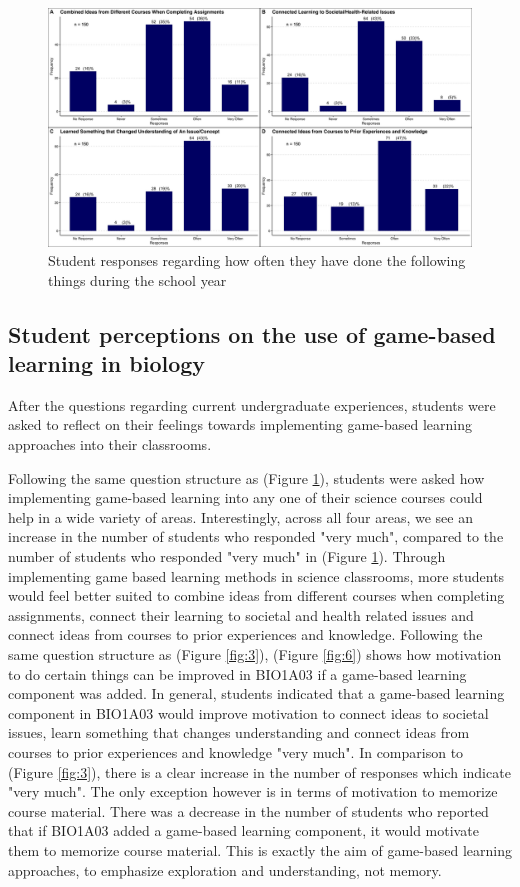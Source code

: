 \documentclass[10pt]{article}
\providecommand{\figref}[1]{(Figure \ref{#1})}  %
\begin{document}
\begin{figure}[H]
	\includegraphics[width=\textwidth]{figures_4f06/how_often_haveyou_done_thefollowing.jpg}
	\caption{Student responses regarding how often they have done the following things during the school year}
	\label{fig:4}
\end{figure}

\subsection{Student perceptions on the use of game-based learning in biology}

After the questions regarding current undergraduate experiences, students were asked to reflect on their feelings towards implementing game-based learning approaches into their classrooms. 

Following the same question structure as \figref{fig:4}, students were asked how implementing game-based learning into any one of their science courses could help in a wide variety of areas. Interestingly, across all four areas, we see an increase in the number of students who responded "very much", compared to the number of students who responded "very much" in \figref{fig:4}. Through implementing game based learning methods in science classrooms, more students would feel better suited to combine ideas from different courses when completing assignments, connect their learning to societal and health related issues and connect ideas from courses to prior experiences and knowledge. Following the same question structure as \figref{fig:3}, \figref{fig:6} shows how motivation to do certain things can be improved in BIO1A03 if a game-based learning component was added. In general, students indicated that a game-based learning component in BIO1A03 would improve motivation to connect ideas to societal issues, learn something that changes understanding and connect ideas from courses to prior experiences and knowledge "very much". In comparison to \figref{fig:3}, there is a clear increase in the number of responses which indicate "very much". The only exception however is in terms of motivation to memorize course material. There was a decrease in the number of students who reported that if BIO1A03 added a game-based learning component, it would motivate them to memorize course material. This is exactly the aim of game-based learning approaches, to emphasize exploration and understanding, not memory.
\end{document}
